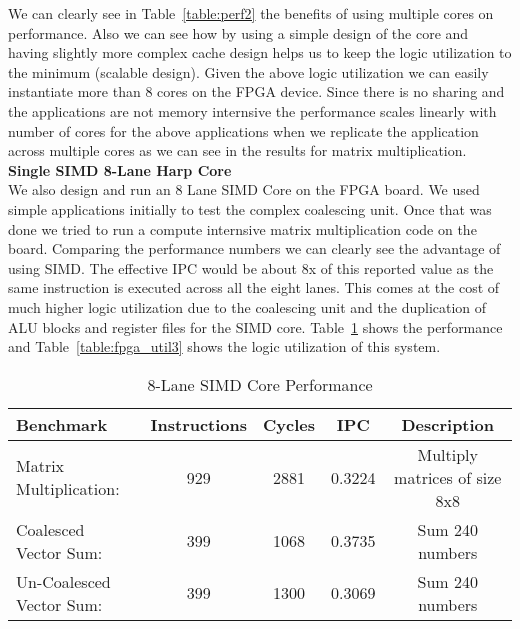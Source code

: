 We can clearly see in Table~\ref{table:perf2} the benefits of using multiple cores on performance. Also we can see how by using a simple design of the core and having slightly more complex cache design helps us to keep the logic utilization to the minimum (scalable design). Given the above logic utilization we can easily instantiate more than 8 cores on the FPGA device.
Since there is no sharing and the applications are not memory internsive the performance scales linearly with number of cores for the above applications when we replicate the application across multiple cores as we can see in the results for matrix multiplication. \\

\noindent\textbf{Single SIMD 8-Lane Harp Core}\\
We also design and run an 8 Lane SIMD Core on the FPGA board. We used simple applications initially to test the complex coalescing unit. Once that was done we tried to run a compute internsive matrix multiplication code on the board. Comparing the performance numbers we can clearly see the advantage of using SIMD. The effective IPC would be about 8x of this reported value as the same instruction is executed across all the eight lanes. This comes at the cost of much higher logic utilization due to the coalescing unit and the duplication of ALU blocks and register files for the SIMD core. Table~\ref{table:perf3} shows the performance and Table~\ref{table:fpga_util3} shows the logic utilization of this system.

\begin{table}[!htbp]
  \centering
  \begin{tabular}{|l|c|c|c|c|}
    \hline
Benchmark		&Instructions 	&Cycles		&IPC		&Description\\
    \hline
Matrix Multiplication:	&929		&2881		&0.3224 	&Multiply matrices of size 8x8\\
Coalesced Vector Sum:	&399		&1068		&0.3735 	&Sum 240 numbers\\
Un-Coalesced Vector Sum:&399		&1300		&0.3069 	&Sum 240 numbers\\
    \hline
  \end{tabular}
  \caption{8-Lane SIMD Core Performance}
  \label{table:perf3}
\end{table}

